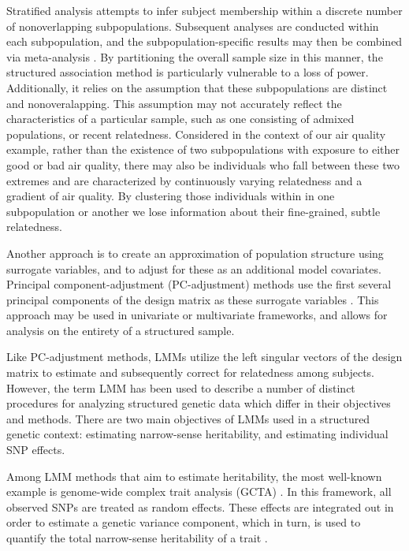 Stratified analysis attempts to infer subject membership within a discrete number of nonoverlapping subpopulations. Subsequent analyses are conducted within each subpopulation, and the subpopulation-specific results may then be combined via meta-analysis \citep{pritchard1999use, pritchard2000association}. By partitioning the overall sample size in this manner, the structured association method is particularly vulnerable to a loss of power. Additionally, it relies on the assumption that these subpopulations are distinct and nonoveralapping. This assumption may not accurately reflect the characteristics of a particular sample, such as one consisting of admixed populations, or recent relatedness. Considered in the context of our air quality example, rather than the existence of two subpopulations with exposure to either good or bad air quality, there may also be individuals who fall between these two extremes and are characterized by continuously varying relatedness and a gradient of air quality. By clustering those individuals within in one subpopulation or another we lose information about their fine-grained, subtle relatedness.

Another approach is to create an approximation of population structure using surrogate variables, and to adjust for these as an additional model covariates. Principal component-adjustment (PC-adjustment) methods use the first several principal components of the design matrix as these surrogate variables \citep{price2006principal}. This approach may be used in univariate or multivariate frameworks, and allows for analysis on the entirety of a structured sample. 

Like PC-adjustment methods, LMMs utilize the left singular vectors of the design matrix to estimate and subsequently correct for relatedness among subjects. However, the term LMM has been used to describe a number of distinct procedures for analyzing structured genetic data which differ in their objectives and methods. There are two main objectives of LMMs used in a structured genetic context: estimating narrow-sense heritability, and estimating individual SNP effects.

Among LMM methods that aim to estimate heritability, the most well-known example is genome-wide complex trait analysis (GCTA) \citep{yang2011gcta}. In this framework, all observed SNPs are treated as random effects. These effects are integrated out in order to estimate a genetic variance component, which in turn, is used to quantify the total narrow-sense heritability of a trait \citep{yang2010common}.

